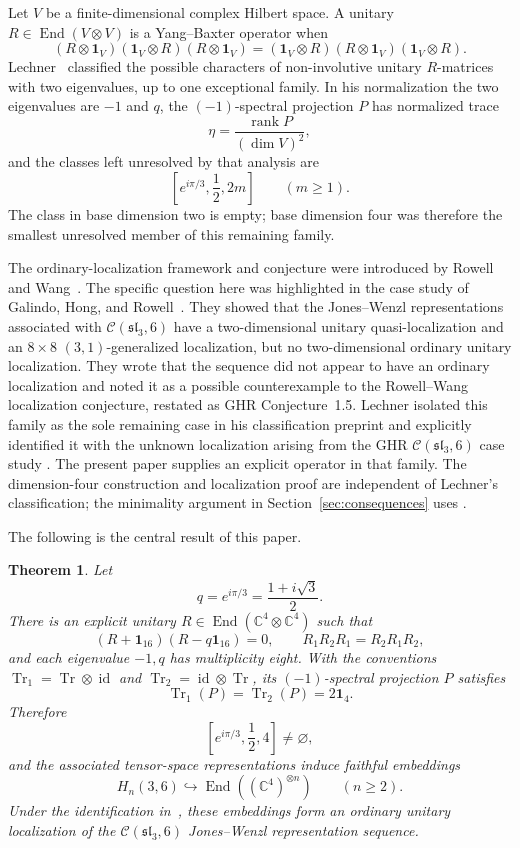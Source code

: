 \documentclass[11pt]{article}
\newtheorem{theorem}{Theorem}[section]
\theoremstyle{remark}
\newcommand{\Id}{\mathbf 1}
\newcommand{\Tr}{\operatorname{Tr}}
\newcommand{\End}{\operatorname{End}}
\newcommand{\rank}{\operatorname{rank}}
\newcommand{\bbC}{\mathbb C}
\newcommand{\cC}{\mathcal C}
\begin{document}
Let \(V\) be a finite-dimensional complex Hilbert space.  A unitary
\(R\in\End(V\otimes V)\) is a Yang--Baxter operator when
\begin{equation}
  (R\otimes\Id_V)(\Id_V\otimes R)(R\otimes\Id_V)
  =
  (\Id_V\otimes R)(R\otimes\Id_V)(\Id_V\otimes R).
  \label{eq:ybe}
\end{equation}
Lechner~\cite{Lechner2026} classified the possible characters of
non-involutive unitary \(R\)-matrices with two eigenvalues, up to one
exceptional family.  In his normalization the two eigenvalues are
\(-1\) and \(q\), the \((-1)\)-spectral projection \(P\) has normalized
trace
\[
  \eta=\frac{\rank P}{(\dim V)^2},
\]
and the classes left unresolved by that analysis are
\[
  \left[e^{i\pi/3},\frac12,2m\right]\qquad(m\ge1).
\]
The class in base dimension two is empty; base dimension four was therefore
the smallest unresolved member of this remaining family.

The ordinary-localization framework and conjecture were introduced by Rowell
and Wang~\cite{RowellWang2012}.  The specific question here was highlighted
in the case study of Galindo, Hong, and Rowell~\cite[\S5.6]{GHR2013}.  They
showed that the Jones--Wenzl
representations associated with \(\cC(\mathfrak{sl}_3,6)\) have a
two-dimensional unitary quasi-localization and an \(8\times8\)
\((3,1)\)-generalized localization,
but no two-dimensional ordinary unitary localization.  They wrote that the
sequence did not appear to have an ordinary localization and noted it as a
possible counterexample to the Rowell--Wang localization conjecture, restated
as GHR Conjecture~1.5.  Lechner isolated
this family as the sole remaining case in his classification preprint and
explicitly identified it with the unknown localization arising from the GHR
\(\cC(\mathfrak{sl}_3,6)\) case study
\cite[p.~16, discussion following Proposition~3.6]{Lechner2026}.  The present
paper supplies an explicit operator in that family.  The dimension-four
construction and localization proof are independent of Lechner's
classification; the minimality argument in Section~\ref{sec:consequences}
uses \cite[Lemma~3.1 and Theorem~3.4]{Lechner2026}.

The following is the central result of this paper.

\begin{theorem}\label{thm:main}
Let
\[
  q=e^{i\pi/3}=\frac{1+i\sqrt3}{2}.
\]
There is an explicit unitary \(R\in\End(\bbC^4\otimes\bbC^4)\) such that
\[
  (R+\Id_{16})(R-q\Id_{16})=0,\qquad
  R_1R_2R_1=R_2R_1R_2,
\]
and each eigenvalue \(-1,q\) has multiplicity eight.  With the conventions
\(\Tr_1=\Tr\otimes\operatorname{id}\) and
\(\Tr_2=\operatorname{id}\otimes\Tr\), its
\((-1)\)-spectral projection \(P\) satisfies
\[
  \Tr_1(P)=\Tr_2(P)=2\Id_4.
\]
Therefore
\[
  \left[e^{i\pi/3},\frac12,4\right]\ne\varnothing,
\]
and the associated tensor-space representations induce faithful
embeddings
\[
  H_n(3,6)\hookrightarrow\End\!\left((\bbC^4)^{\otimes n}\right)
  \qquad(n\ge2).
\]
Under the identification in~\cite[\S5.6]{GHR2013}, these embeddings form an
ordinary unitary localization of the
\(\cC(\mathfrak{sl}_3,6)\) Jones--Wenzl representation sequence.
\end{theorem}
\end{document}
